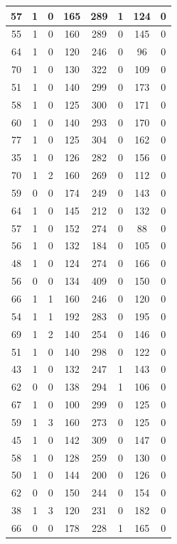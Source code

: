 \documentclass{article}
\begin{document}
\begin{longtable}{|c|c|c|c|c|c|c|c|}
\hline
57 & 1 & 0 & 165 & 289 & 1 & 124 & 0 \\
\hline
55 & 1 & 0 & 160 & 289 & 0 & 145 & 0 \\
\hline
64 & 1 & 0 & 120 & 246 & 0 & 96 & 0 \\
\hline
70 & 1 & 0 & 130 & 322 & 0 & 109 & 0 \\
\hline
51 & 1 & 0 & 140 & 299 & 0 & 173 & 0 \\
\hline
58 & 1 & 0 & 125 & 300 & 0 & 171 & 0 \\
\hline
60 & 1 & 0 & 140 & 293 & 0 & 170 & 0 \\
\hline
77 & 1 & 0 & 125 & 304 & 0 & 162 & 0 \\
\hline
35 & 1 & 0 & 126 & 282 & 0 & 156 & 0 \\
\hline
70 & 1 & 2 & 160 & 269 & 0 & 112 & 0 \\
\hline
59 & 0 & 0 & 174 & 249 & 0 & 143 & 0 \\
\hline
64 & 1 & 0 & 145 & 212 & 0 & 132 & 0 \\
\hline
57 & 1 & 0 & 152 & 274 & 0 & 88 & 0 \\
\hline
56 & 1 & 0 & 132 & 184 & 0 & 105 & 0 \\
\hline
48 & 1 & 0 & 124 & 274 & 0 & 166 & 0 \\
\hline
56 & 0 & 0 & 134 & 409 & 0 & 150 & 0 \\
\hline
66 & 1 & 1 & 160 & 246 & 0 & 120 & 0 \\
\hline
54 & 1 & 1 & 192 & 283 & 0 & 195 & 0 \\
\hline
69 & 1 & 2 & 140 & 254 & 0 & 146 & 0 \\
\hline
51 & 1 & 0 & 140 & 298 & 0 & 122 & 0 \\
\hline
43 & 1 & 0 & 132 & 247 & 1 & 143 & 0 \\
\hline
62 & 0 & 0 & 138 & 294 & 1 & 106 & 0 \\
\hline
67 & 1 & 0 & 100 & 299 & 0 & 125 & 0 \\
\hline
59 & 1 & 3 & 160 & 273 & 0 & 125 & 0 \\
\hline
45 & 1 & 0 & 142 & 309 & 0 & 147 & 0 \\
\hline
58 & 1 & 0 & 128 & 259 & 0 & 130 & 0 \\
\hline
50 & 1 & 0 & 144 & 200 & 0 & 126 & 0 \\
\hline
62 & 0 & 0 & 150 & 244 & 0 & 154 & 0 \\
\hline
38 & 1 & 3 & 120 & 231 & 0 & 182 & 0 \\
\hline
66 & 0 & 0 & 178 & 228 & 1 & 165 & 0 \\

\end{longtable}
\end{document}
